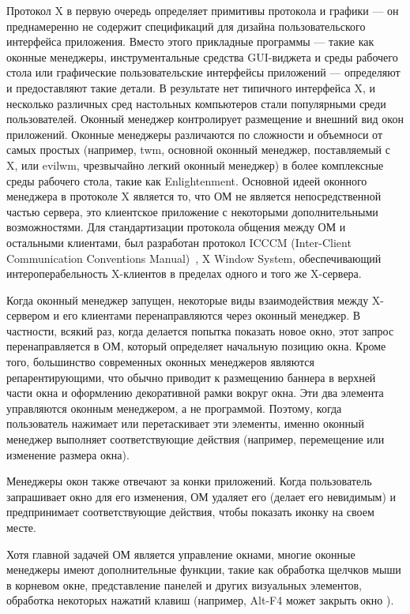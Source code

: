 Протокол X в первую очередь определяет примитивы протокола и графики --- он преднамеренно не содержит спецификаций для дизайна пользовательского интерфейса приложения. Вместо этого прикладные программы --- такие как оконные менеджеры, инструментальные средства GUI-виджета и среды рабочего стола или графические пользовательские интерфейсы приложений --- определяют и предоставляют такие детали. В результате нет типичного интерфейса X, и несколько различных сред настольных компьютеров стали популярными среди пользователей. Оконный менеджер контролирует размещение и внешний вид окон приложений.  Оконные менеджеры различаются по сложности и объемноси от самых простых (например, twm, основной оконный менеджер, поставляемый с X, или evilwm, чрезвычайно легкий оконный менеджер) в более комплексные среды рабочего стола, такие как Enlightenment. Основной идеей оконного менеджера в протоколе X является то, что ОМ не является непосредственной частью сервера, это клиентское приложение с некоторыми дополнительными возможностями. Для стандартизации протокола общения между ОМ и остальными клиентами, был разработан протокол ICCCM (Inter-Client Communication Conventions Manual)~\cite{icccm}, X Window System, обеспечивающий интероперабельность X-клиентов в пределах одного и того же X-сервера.

Когда оконный менеджер запущен, некоторые виды взаимодействия между X-сервером и его клиентами перенаправляются через оконный менеджер. В частности, всякий раз, когда делается попытка показать новое окно, этот запрос перенаправляется в ОМ, который определяет начальную позицию окна. Кроме того, большинство современных оконных менеджеров являются репарентирующими, что обычно приводит к размещению баннера в верхней части окна и оформлению декоративной рамки вокруг окна. Эти два элемента управляются оконным менеджером, а не программой. Поэтому, когда пользователь нажимает или перетаскивает эти элементы, именно оконный менеджер выполняет соответствующие действия (например, перемещение или изменение размера окна).

Менеджеры окон также отвечают за конки приложений. Когда пользователь запрашивает окно для его изменения, ОМ удаляет его (делает его невидимым) и предпринимает соответствующие действия, чтобы показать иконку на своем месте. 

Хотя главной задачей ОМ является управление окнами, многие оконные менеджеры имеют дополнительные функции, такие как обработка щелчков мыши в корневом окне, представление панелей и других визуальных элементов, обработка некоторых нажатий клавиш (например, Alt-F4 может закрыть окно ).


